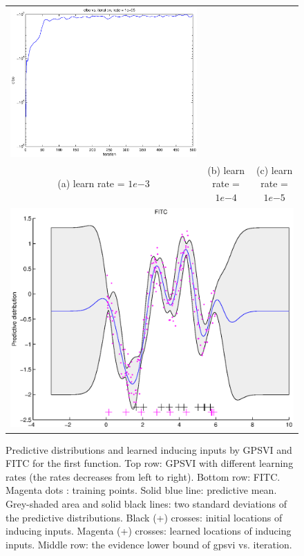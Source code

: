 \documentclass{article} %
\begin{document}
\begin{figure}
\begin{tabular}{ccc}
\includegraphics[scale=0.3]{figures/func1-svi-lrate1e-05-bound.eps} \\ 
(a) learn rate = $1e{-3}$ & (b) learn rate = $1e{-4}$ & (c) learn rate = $1e{-5}$ \\
\multicolumn{3}{c}{\includegraphics[scale=0.4]{figures/func1-fitc.eps}}
\end{tabular}
\caption{Predictive distributions and learned inducing inputs by GPSVI and FITC for the first function. Top row: GPSVI with different learning rates (the rates decreases from left to right). Bottom row: FITC. Magenta dots : training points. Solid blue line: predictive mean. Grey-shaded area and solid black lines: two standard deviations of the predictive distributions. Black (+) crosses: initial locations of inducing inputs. Magenta (+) crosses: learned locations of inducing inputs.  Middle row: the evidence lower bound of gpsvi vs. iteration.}
\label{fig1}
\end{figure}
\end{document}

